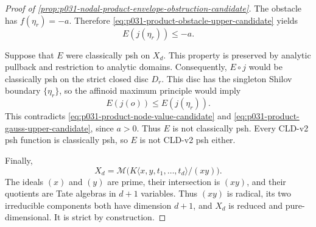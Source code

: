 \begin{proof}[Proof of
\cref{prop:p031-nodal-product-envelope-obstruction-candidate}]
The obstacle has \(f(\eta_r)=-a\).  Therefore
\eqref{eq:p031-product-obstacle-upper-candidate} yields
\begin{equation}
\label{eq:p031-product-gauss-upper-candidate}
                         E(j(\eta_r))\leq-a.
\end{equation}

Suppose that \(E\) were classically psh on \(X_d\).  This property is
preserved by analytic pullback and restriction to analytic domains.
Consequently, \(E\circ j\) would be classically psh on the strict closed
disc \(D_r\).  This disc has the singleton Shilov boundary
\(\{\eta_r\}\), so the affinoid maximum principle would imply
\[
                         E(j(o))\leq E(j(\eta_r)).
\]
This contradicts \eqref{eq:p031-product-node-value-candidate} and
\eqref{eq:p031-product-gauss-upper-candidate}, since \(a>0\).  Thus \(E\)
is not classically psh.  Every CLD-v2 psh function is classically psh, so
\(E\) is not CLD-v2 psh either.

Finally,
\[
 X_d=\mathcal M\bigl(
 K\langle x,y,t_1,\ldots,t_d\rangle/(xy)\bigr).
\]
The ideals \((x)\) and \((y)\) are prime, their intersection is \((xy)\),
and their quotients are Tate algebras in \(d+1\) variables.  Thus \((xy)\)
is radical, its two irreducible components both have dimension \(d+1\),
and \(X_d\) is reduced and pure-dimensional.  It is strict by construction.
\end{proof}
